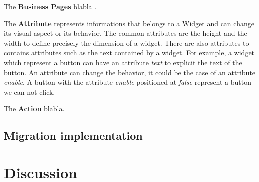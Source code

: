 \documentclass[conference]{IEEEtran}
\begin{document}
    The \textbf{Business Pages} blabla .

    The \textbf{Attribute} represents informations that belongs to a Widget and can change its visual aspect or its behavior.
    The common attributes are the height and the width to define precisely the dimension of a widget.
    There are also attributes to contains attributes such as the text contained by a widget. 
    For example, a widget which represent a button can have an attribute \textit{text} to 
        explicit the text of the button.
    An attribute can change the behavior, it could be the case of an attribute \textit{enable}.
    A button with the attribute \textit{enable} positioned at \textit{false} represent a button
        we can not click.

    The \textbf{Action} blabla.

    
    
    \subsection{Migration implementation}
    \label{sec:implementation}
    
    
    
    \section{Discussion}
    \label{sec:discussion}
    
\end{document}

